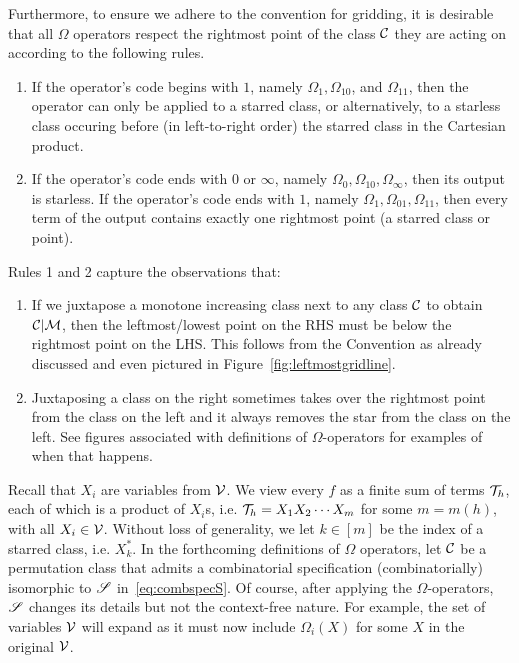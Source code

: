 \documentclass[12pt, a4paper, twoside]{report}
\begin{document}
Furthermore, to ensure we adhere to the convention for gridding, it is desirable that all $\Omega$ operators respect the rightmost point of the class $\mathcal{C}$ they are acting on according to the following rules.
\begin{enumerate}
\item If the operator's code begins with $1$, namely $\Omega_1,\Omega_{10}$, and $\Omega_{11}$, then the operator can only be applied to a starred class, or alternatively, to a starless class occuring before (in left-to-right order) the starred class in the Cartesian product.
\item If the operator's code ends with $0$ or $\infty$, namely $\Omega_0, \Omega_{10}, \Omega_\infty$, then its output is starless. If the operator's code ends with $1$, namely $\Omega_1, \Omega_{01}, \Omega_{11}$, then every term of the output contains exactly one rightmost point (a starred class or point).
\end{enumerate}
Rules 1 and 2 capture the observations that:
\begin{enumerate}
\item If we juxtapose a monotone increasing class next to any class $\mathcal{C}$ to obtain $\mathcal{C}|\mathcal{M}$, then the leftmost/lowest point on the RHS must be below the rightmost point on the LHS. This follows from the Convention as already discussed and even pictured in Figure~\ref{fig:leftmostgridline}.
\item Juxtaposing a class on the right sometimes takes over the rightmost point from the class on the left and it always removes the star from the class on the left. See figures associated with definitions of $\Omega$-operators for examples of when that happens.
\end{enumerate}

Recall that $X_i$ are variables from $\mathcal{V}$. We view every $f$ as a finite sum of terms $\mathcal{T}_h$, each of which is a product of $X_i$s, i.e. $\mathcal{T}_h = X_1X_2\cdots X_m$ for some $m = m(h)$, with all $X_i \in \mathcal{V}$. Without loss of generality, we let $k \in [m]$ be the index of a starred class, i.e. $X_k^*$. In the forthcoming definitions of $\Omega$ operators, let $\mathcal{C}$ be a permutation class that admits a combinatorial specification (combinatorially) isomorphic to $\mathscr{S}$ in~\eqref{eq:combspecS}. Of course, after applying the $\Omega$-operators, $\mathscr{S}$ changes its details but not the context-free nature. For example, the set of variables $\mathcal{V}$ will expand as it must now include $\Omega_i(X)$ for some $X$ in the original $\mathcal{V}$.
\end{document}
